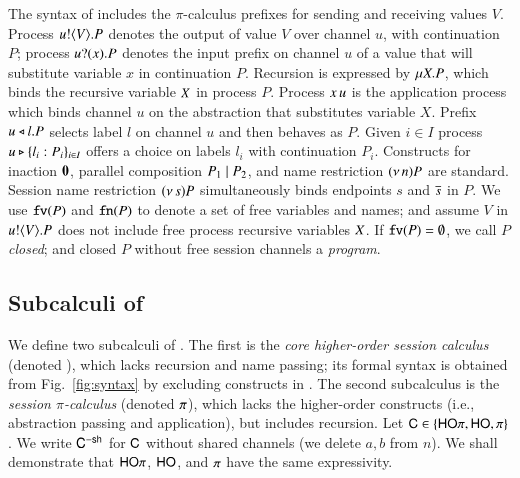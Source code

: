 The syntax of \HOp includes the
$\pi$-calculus prefixes for sending and receiving values $V$.
Process $u ! \langle V \rangle . P$ denotes the output of value $V$
over channel $u$, with continuation $P$;
process $u ? (x) . P$ denotes the input prefix on channel $u$ of a value
that 
will substitute variable $x$ in continuation $P$. 
Recursion is expressed by $\mu X. P$,
which binds the recursive variable $X$ in process $P$.
Process $x\, {u}$ is the application
process which binds channel $u$ on the abstraction that
substitutes variable $X$.
Prefix $u \triangleleft l . P$ selects label $l$ on channel $u$ and then behaves as $P$.
Given $i \in I$ process $u \triangleright \{l_i: P_i\}_{i \in I}$ offers a choice on labels $l_i$ with
continuation $P_i$.
Constructs for 
inaction $\mathbf{0}$,  parallel composition $P_1 \;|\; P_2$, and 
name restriction $(\nu\, n) P$ are standard.
Session name restriction $(\nu\, s) P$ simultaneously binds endpoints $s$ and $\overline{s}$ in $P$.
We use $\mathtt{fv}(P)$ and $\mathtt{fn}(P)$ to denote a set of free variables and names; 
and assume $V$ in $u ! \langle V \rangle .{P}$ does not include free process recursive 
variables $X$. 
If $\mathtt{fv}(P) = \emptyset$, we call $P$ {\em closed}; and closed $P$ without 
free session channels a {\em program}. 

\subsection{Subcalculi of \HOp}
\label{subsec:subcalculi}
\noi
We define two subcalculi of \HOp. 
The first is the 
{\em core higher-order session calculus} (denoted \HO),
which lacks recursion and name passing; its 
formal syntax is obtained from Fig.~\ref{fig:syntax} by excluding 
constructs in .
The second subcalculus is 
the {\em session $\pi$-calculus} 
(denoted $\pi$), which 
lacks  the
higher-order constructs
(i.e., abstraction passing and application), but includes recursion.
Let $\mathsf{C} \in \{\mathsf{HO}\pi, \mathsf{HO}, \pi\}$. We write 
$\mathsf{C}^{-\mathsf{sh}}$ for $\mathsf{C}$ without shared channels
 (we delete $a,b$ from $n$). 
 We shall demonstrate that 
$\mathsf{HO}\pi$, $\mathsf{HO}$, and $\pi$ have the same expressivity.

